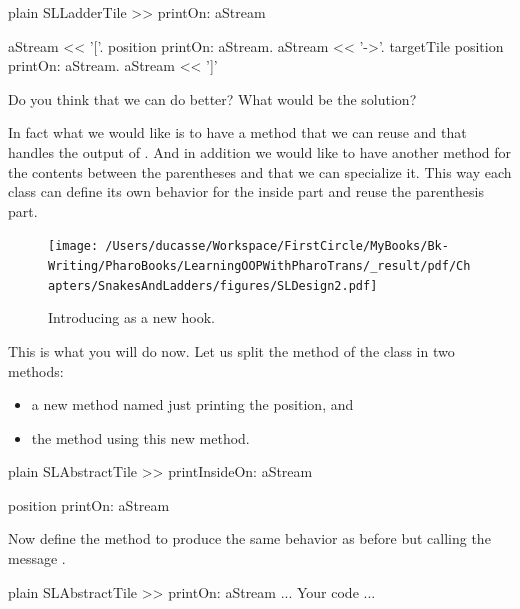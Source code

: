 \documentclass[10pt,twoside,english]{_support/latex/sbabook/sbabook}
\begin{document}
\begin{displaycode}{plain}
SLLadderTile >> printOn: aStream

	aStream << '['.
	position printOn: aStream.
	aStream << '->'.
	targetTile position printOn: aStream.
	aStream << ']'
\end{displaycode}

Do you think that we can do better? What would be the solution?

In fact what we would like is to have a method that we can reuse and that 
handles the output of  . And in addition we would like to have another method for the contents between the parentheses and that we can specialize it.  This way each class can define its own behavior for the inside part and reuse the parenthesis part.  


\begin{figure}

\begin{center}
\texttt{[image: /Users/ducasse/Workspace/FirstCircle/MyBooks/Bk-Writing/PharoBooks/LearningOOPWithPharoTrans/\_result/pdf/Chapters/SnakesAndLadders/figures/SLDesign2.pdf]}\caption{Introducing  as a new hook.\label{fig:sldesign2}}\end{center}
\end{figure}


This is what you will do now.
Let us split the  method of the class  in two methods:

\begin{itemize}
\item a new method named  just printing the position, and
\item the  method using this new method. 
\end{itemize}

\begin{displaycode}{plain}
SLAbstractTile >> printInsideOn: aStream

	position printOn: aStream
\end{displaycode}

Now define the method  to produce the same behavior as before but calling the message . 

\begin{displaycode}{plain}
SLAbstractTile >> printOn: aStream
	... Your code ...
\end{displaycode}
\end{document}
